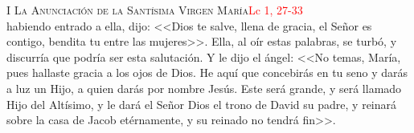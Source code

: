\textsc{\Large{I La Anunciación de la Santísima Virgen María}}\hfill\textcolor{red}{Lc 1, 27-33}\\[-2mm]
habiendo entrado a ella, dijo: <<Dios te salve, llena de gracia, el Señor es contigo, bendita tu entre las mujeres>>. Ella, al oír estas palabras, se turbó,
y discurría que podría ser esta salutación. Y le dijo el ángel: <<No temas, María, pues hallaste gracia a los ojos de Dios. He aquí que concebirás en tu seno y darás a luz un Hijo,
a quien darás por nombre Jesús. Este será grande, y será llamado Hijo del Altísimo, y le dará el Señor Dios el trono de David su padre, y reinará sobre la casa de Jacob etérnamente, 
y su reinado no tendrá fin>>.